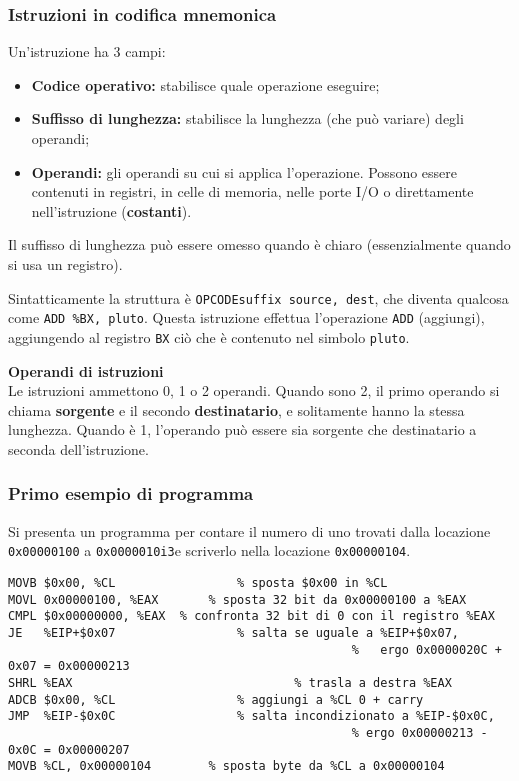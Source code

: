 \documentclass[a4paper,11pt]{article}
\begin{document}
\subsubsection{Istruzioni in codifica mnemonica}
Un'istruzione ha 3 campi:
\begin{itemize}
	\item \textbf{Codice operativo:} stabilisce quale operazione eseguire;
	\item \textbf{Suffisso di lunghezza:} stabilisce la lunghezza (che può variare) degli operandi;	
	\item \textbf{Operandi:} gli operandi su cui si applica l'operazione. 
		Possono essere contenuti in registri, in celle di memoria, nelle porte I/O o direttamente nell'istruzione (\textbf{costanti}).
\end{itemize}

Il suffisso di lunghezza può essere omesso quando è chiaro (essenzialmente quando si usa un registro).

Sintatticamente la struttura è \texttt{OPCODEsuffix source, dest}, che diventa qualcosa come \texttt{ADD \%BX, pluto}.
Questa istruzione effettua l'operazione \texttt{ADD} (aggiungi), aggiungendo al registro \texttt{BX} ciò che è contenuto nel simbolo \texttt{pluto}.

\par\medskip
\noindent
\textsf{\textbf{Operandi di istruzioni}} \\
Le istruzioni ammettono 0, 1 o 2 operandi.
Quando sono 2, il primo operando si chiama \textbf{sorgente} e il secondo \textbf{destinatario}, e solitamente hanno la stessa lunghezza.
Quando è 1, l'operando può essere sia sorgente che destinatario a seconda dell'istruzione.

\subsubsection{Primo esempio di programma}

Si presenta un programma per contare il numero di uno trovati dalla locazione \texttt{0x00000100} a \texttt{0x0000010i3}e scriverlo nella locazione \texttt{0x00000104}. 

\begin{lstlisting}[style=codestyle]	
MOVB $0x00, %CL					% sposta $0x00 in %CL
MOVL 0x00000100, %EAX		% sposta 32 bit da 0x00000100 a %EAX
CMPL $0x00000000, %EAX	% confronta 32 bit di 0 con il registro %EAX
JE   %EIP+$0x07					% salta se uguale a %EIP+$0x07, 
												%	ergo 0x0000020C + 0x07 = 0x00000213
SHRL %EAX								% trasla a destra %EAX
ADCB $0x00, %CL					% aggiungi a %CL 0 + carry 
JMP  %EIP-$0x0C					% salta incondizionato a %EIP-$0x0C,
												% ergo 0x00000213 - 0x0C = 0x00000207
MOVB %CL, 0x00000104		% sposta byte da %CL a 0x00000104
\end{lstlisting}
\end{document}
